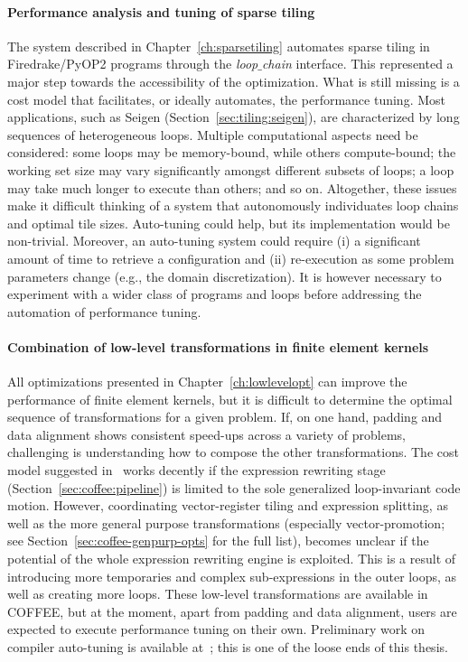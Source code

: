 \paragraph{Performance analysis and tuning of sparse tiling}
The system described in Chapter~\ref{ch:sparsetiling} automates sparse tiling in Firedrake/PyOP2 programs through the {\em loop$\_$chain} interface. This represented a major step towards the accessibility of the optimization. What is still missing is a cost model that facilitates, or ideally automates, the performance tuning. Most applications, such as Seigen (Section~\ref{sec:tiling:seigen}), are characterized by long sequences of heterogeneous loops. Multiple computational aspects need be considered: some loops may be memory-bound, while others compute-bound; the working set size may vary significantly amongst different subsets of loops; a loop may take much longer to execute than others; and so on. Altogether, these issues make it difficult thinking of a system that autonomously individuates loop chains and optimal tile sizes. Auto-tuning could help, but its implementation would be non-trivial. Moreover, an auto-tuning system could require (i) a significant amount of time to retrieve a configuration and (ii) re-execution as some problem parameters change (e.g., the domain discretization). It is however necessary to experiment with a wider class of programs and loops before addressing the automation of performance tuning.


\paragraph{Combination of low-level transformations in finite element kernels}
All optimizations presented in Chapter~\ref{ch:lowlevelopt} can improve the performance of finite element kernels, but it is difficult to determine the optimal sequence of transformations for a given problem. If, on one hand, padding and data alignment shows consistent speed-ups across a variety of problems, challenging is understanding how to compose the other transformations. The cost model suggested in~\cite{Luporini-coffee} works decently if the expression rewriting stage (Section~\ref{sec:coffee:pipeline}) is limited to the sole generalized loop-invariant code motion. However, coordinating vector-register tiling and expression splitting, as well as the more general purpose transformations (especially vector-promotion; see Section~\ref{sec:coffee-genpurp-opts} for the full list), becomes unclear if the potential of the whole expression rewriting engine is exploited. This is a result of introducing more temporaries and complex sub-expressions in the outer loops, as well as creating more loops. These low-level transformations are available in COFFEE, but at the moment, apart from padding and data alignment, users are expected to execute performance tuning on their own. Preliminary work on compiler auto-tuning is available at~\citep{coffee-code}; this is one of the loose ends of this thesis.


